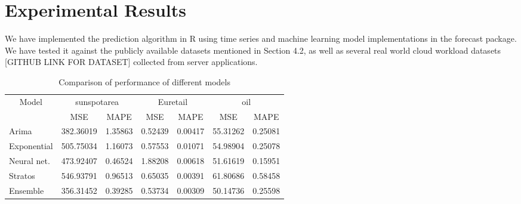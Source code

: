 
\section{Experimental Results}

We have implemented the prediction algorithm in R using time series and machine learning model implementations in the forecast package. We have tested it against the publicly available datasets mentioned in Section 4.2, as well as several real world cloud workload datasets [GITHUB LINK FOR DATASET] collected from server applications.

\begin{table}[]
\centering
\caption{Comparison of performance of different models}
\begin{tabular}{|l|l|r|r|r|r|r|}
\hline
\multicolumn{1}{|c|}{\multirow{2}{*}{Model}} & \multicolumn{2}{c|}{sunspotarea}                        & \multicolumn{2}{c|}{Euretail}                               & \multicolumn{2}{c|}{oil}                                     \\ \cline{2-7} 
\multicolumn{1}{|c|}{}                       & \multicolumn{1}{c|}{MSE} & \multicolumn{1}{c|}{MAPE}    & \multicolumn{1}{c|}{MSE}     & \multicolumn{1}{c|}{MAPE}    & \multicolumn{1}{c|}{MSE}      & \multicolumn{1}{c|}{MAPE}    \\ \hline
Arima                                        & 382.36019                & 1.35863                      & 0.52439                      & 0.00417                      & 55.31262                      & 0.25081                      \\ \hline
Exponential                                  & 505.75034                & 1.16073                      & 0.57553                      & 0.01071                      & 54.98904                      & 0.25078                      \\ \hline
Neural net.                                         & 473.92407                & 0.46524                      & 1.88208                      & 0.00618                      & 51.61619                      & 0.15951                      \\ \hline
Stratos                                      & 546.93791                & 0.96513                      & 0.65035                      & 0.00391                      & 61.80686                      & 0.58458                      \\ \hline
Ensemble                                     & 356.31452                & \multicolumn{1}{l|}{0.39285} & \multicolumn{1}{l|}{0.53734} & \multicolumn{1}{l|}{0.00309} & \multicolumn{1}{l|}{50.14736} & \multicolumn{1}{l|}{0.25598} \\ \hline
\end{tabular}
\end{table}
